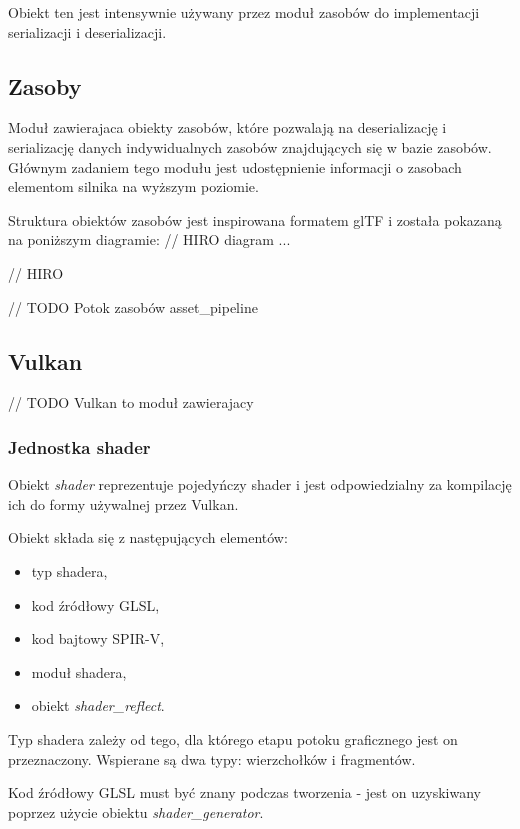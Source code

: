 Obiekt ten jest intensywnie używany przez moduł zasobów do implementacji serializacji i deserializacji.

\subsection{Zasoby}

Moduł zawierajaca obiekty zasobów, które pozwalają na deserializację i serializację danych indywidualnych zasobów znajdujących się w bazie zasobów.
Głównym zadaniem tego modułu jest udostępnienie informacji o zasobach elementom silnika na wyższym poziomie.

Struktura obiektów zasobów jest inspirowana formatem glTF i została pokazaną na poniższym diagramie:
// HIRO diagram
...

// HIRO

// TODO Potok zasobów asset\_pipeline

\subsection{Vulkan}

// TODO Vulkan to moduł zawierajacy 

\subsubsection{Jednostka shader}
Obiekt \textit{shader} reprezentuje pojedyńczy shader i jest odpowiedzialny za kompilację ich do formy używalnej przez Vulkan.

Obiekt składa się z następujących elementów:
\begin{itemize}
	\item typ shadera,
	\item kod źródłowy GLSL,
	\item kod bajtowy SPIR-V,
	\item moduł shadera,
	\item obiekt \textit{shader\_reflect}.
\end{itemize}

Typ shadera zależy od tego, dla którego etapu potoku graficznego jest on przeznaczony.
Wspierane są dwa typy: wierzchołków i fragmentów.

Kod źródłowy GLSL must być znany podczas tworzenia - jest on uzyskiwany poprzez użycie obiektu \textit{shader\_generator}.

